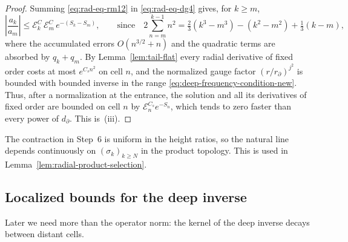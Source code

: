 \begin{proof}
Summing \eqref{eq:rad-eq-rm12} in \eqref{eq:rad-eq-dg4} gives, for
$k\ge m$,
\begin{equation}\label{eq:rad-eq-rm17}
 \left|\frac{a_k}{a_m}\right|
 \le\mathcal E_k^C\,\mathcal E_m^C\,e^{-(S_k-S_m)},
 \qquad\text{since}\quad
 2\sum_{n=m}^{k-1}n^2
 =\tfrac23(k^3-m^3)-(k^2-m^2)+\tfrac13(k-m),
\end{equation}
where the accumulated errors $O(n^{3/2}+n)$ and the quadratic terms
are absorbed by $q_k+q_m$. By Lemma~\ref{lem:tail-flat} every radial
derivative of fixed order costs at most $e^{C_sn^2}$ on cell $n$, and
the normalized gauge factor $(r/r_\partial)^{j^2}$ is bounded with
bounded inverse in the range \eqref{eq:deep-frequency-condition-new}.
Thus, after a normalization at the entrance, the solution and all its
derivatives of fixed order are bounded on cell $n$ by
$\mathcal E_n^{C_s}e^{-S_n}$, which tends to zero faster than every
power of $d_\partial$. This is~(iii).
\end{proof}

\begin{remark}\label{rem:line-continuity}
The contraction in Step~6 is uniform in the height ratios, so the
natural line depends continuously on $(\sigma_k)_{k\ge N}$ in the
product topology. This is used in
Lemma~\ref{lem:radial-product-selection}.
\end{remark}

\subsection{Localized bounds for the deep inverse}
\label{subsec:deep-green}

Later we need more than the operator norm: the kernel of the deep
inverse decays between distant cells.

